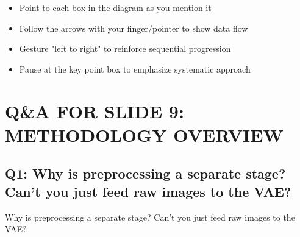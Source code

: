 \documentclass[11pt,a4paper]{article}
\begin{document}
\begin{itemize}[leftmargin=1cm]
    \item Point to each box in the diagram as you mention it
    \item Follow the arrows with your finger/pointer to show data flow
    \item Gesture "left to right" to reinforce sequential progression
    \item Pause at the key point box to emphasize systematic approach
\end{itemize}

\clearpage

\section{Q\&A FOR SLIDE 9: METHODOLOGY OVERVIEW}

\subsection{Q1: Why is preprocessing a separate stage? Can't you just feed raw images to the VAE?}

\begin{qbox}[title=Question]
Why is preprocessing a separate stage? Can't you just feed raw images to the VAE?
\end{qbox}
\end{document}
